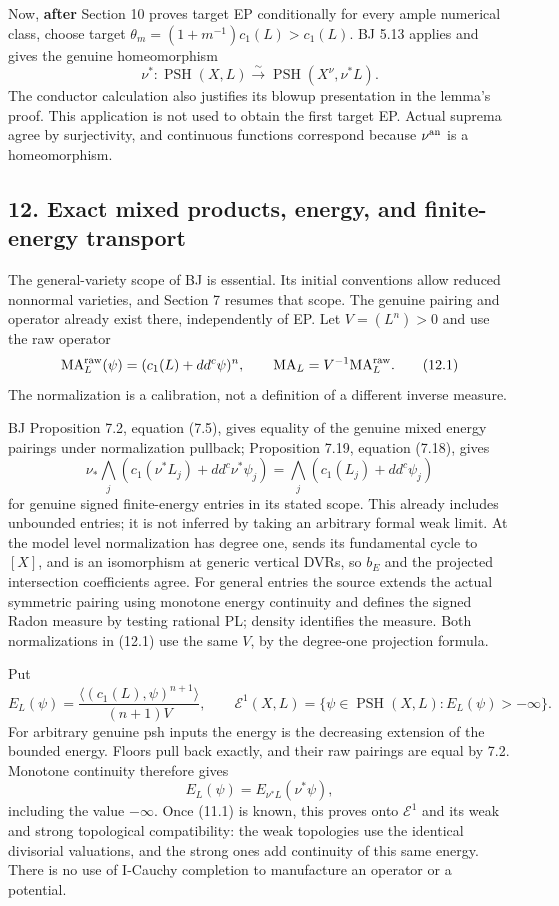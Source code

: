 \documentclass[
  10pt,
]{article}
\begin{document}
Now, \textbf{after} Section 10 proves target EP conditionally for every
ample numerical class, choose target
\(\theta_m=(1+m^{-1})c_1(L)>c_1(L)\). BJ 5.13 applies and gives the
genuine homeomorphism \[\nu^*:\operatorname{PSH}(X,L)\xrightarrow{\sim}
\operatorname{PSH}(X^\nu,\nu^*L).                                      \tag{11.1}\]
The conductor calculation also justifies its blowup presentation in the
lemma's proof. This application is not used to obtain the first target
EP. Actual suprema agree by surjectivity, and continuous functions
correspond because \(\nu^{\rm an}\) is a homeomorphism.

\subsection{12. Exact mixed products, energy, and finite-energy
transport}\label{exact-mixed-products-energy-and-finite-energy-transport}

The general-variety scope of BJ is essential. Its initial conventions
allow reduced nonnormal varieties, and Section 7 resumes that scope. The
genuine pairing and operator already exist there, independently of EP.
Let \(V=(L^n)>0\) and use the raw operator
\[\mathrm{MA}^{\rm raw}_L(\psi)=(c_1(L)+dd^c\psi)^n,
\qquad \mathrm{MA}_L=V^{-1}\mathrm{MA}^{\rm raw}_L.                        \tag{12.1}\]
The normalization is a calibration, not a definition of a different
inverse measure.

BJ Proposition 7.2, equation (7.5), gives equality of the genuine mixed
energy pairings under normalization pullback; Proposition 7.19, equation
(7.18), gives \[\nu_*\bigwedge_j(c_1(\nu^*L_j)+dd^c\nu^*\psi_j)
=\bigwedge_j(c_1(L_j)+dd^c\psi_j)                                      \tag{12.2}\]
for genuine signed finite-energy entries in its stated scope. This
already includes unbounded entries; it is not inferred by taking an
arbitrary formal weak limit. At the model level normalization has degree
one, sends its fundamental cycle to \([X]\), and is an isomorphism at
generic vertical DVRs, so \(b_E\) and the projected intersection
coefficients agree. For general entries the source extends the actual
symmetric pairing using monotone energy continuity and defines the
signed Radon measure by testing rational PL; density identifies the
measure. Both normalizations in (12.1) use the same \(V\), by the
degree-one projection formula.

Put \[E_L(\psi)=\frac{\langle(c_1(L),\psi)^{n+1}\rangle}{(n+1)V},\qquad
\mathcal E^1(X,L)=\{\psi\in\operatorname{PSH}(X,L):E_L(\psi)>-\infty\}.
\] For arbitrary genuine psh inputs the energy is the decreasing
extension of the bounded energy. Floors pull back exactly, and their raw
pairings are equal by 7.2. Monotone continuity therefore gives
\[E_L(\psi)=E_{\nu^*L}(\nu^*\psi),                                      \tag{12.3}\]
including the value \(-\infty\). Once (11.1) is known, this proves onto
\(\mathcal E^1\) and its weak and strong topological compatibility: the
weak topologies use the identical divisorial valuations, and the strong
ones add continuity of this same energy. There is no use of I-Cauchy
completion to manufacture an operator or a potential.
\end{document}
